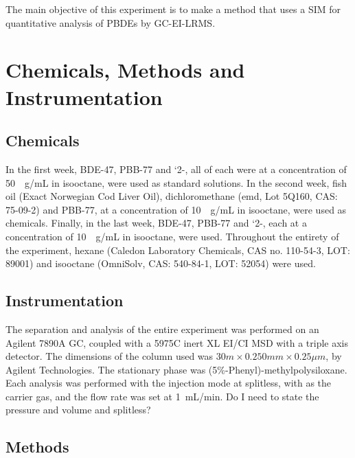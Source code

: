 \documentclass[a4paper, 12pt]{article}
\begin{document}
The main objective of this experiment is to make a method that uses a SIM for quantitative analysis of PBDEs by GC-EI-LRMS.


\section{Chemicals, Methods and Instrumentation}

\subsection{Chemicals}
In the first week, BDE-47, PBB-77 and `2-, all of each were at a concentration of \SI{50}{\mu{}g/mL} in isooctane, were used as standard solutions. In the second week, fish oil (Exact Norwegian Cod Liver Oil), dichloromethane (emd, Lot 5Q160, CAS: 75-09-2) and PBB-77, at a concentration of \SI{10}{\mu{}g/mL} in isooctane, were used as chemicals. Finally, in the last week, BDE-47, PBB-77 and `2-, each at a concentration of \SI{10}{\mu{}g/mL} in isooctane, were used. Throughout the entirety of the experiment, hexane (Caledon Laboratory Chemicals, CAS no. 110-54-3, LOT: 89001) and isooctane (OmniSolv, CAS: 540-84-1, LOT: 52054) were used.

\subsection{Instrumentation}
The separation and analysis of the entire experiment was performed on an Agilent 7890A GC, coupled with a 5975C inert XL EI/CI MSD with a triple axis detector. The dimensions of the column used was $30m \times 0.250mm \times 0.25\mu{}m$, by Agilent Technologies. The stationary phase was (5\%-Phenyl)-methylpolysiloxane. Each analysis was performed with the injection mode at splitless, with  as the carrier gas, and the flow rate was set at \SI{1}{mL/min}. Do I need to state the pressure and volume and splitless?

\subsection{Methods}

\end{document}
